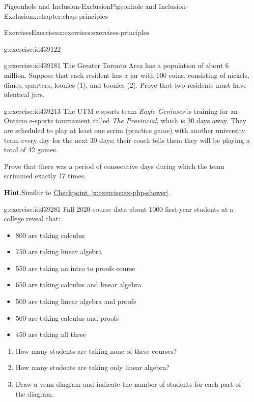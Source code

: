 \documentclass[oneside,10pt,]{book}
\newcommand{\blocktitlefont}{\relax}
\newcommand{\xreffont}{\relax}
\numberwithin{equation}{section}
\begin{document}
\begin{chapterptx}{Pigeonhole and Inclusion-Exclusion}{}{Pigeonhole and Inclusion-Exclusion}{}{}{x:chapter:chap-principles}
\begin{exercises-section}{Exercises}{}{Exercises}{}{}{x:exercises:exercises-principles}
\begin{divisionexercise}{8}{}{}{g:exercise:id439122}
\end{divisionexercise}%
\begin{divisionexercise}{9}{}{}{g:exercise:id439181}%
The Greater Toronto Area has a population of about 6 million. Suppose that each resident has a jar with 100 coins, consisting of nickels, dimes, quarters, loonies (\textdollar{}1), and toonies (\textdollar{}2). Prove that two residents must have identical jars.%
\end{divisionexercise}%
\begin{divisionexercise}{10}{}{}{g:exercise:id439213}%
The UTM e-sports team \emph{Eagle Geniuses} is training for an Ontario e-sports tournament called \emph{The Provincial}, which is 30 days away. They are scheduled to play at least one scrim (practice game) with another university team every day for the next 30 days; their coach tells them they will be playing a total of 42 games.%
\par
Prove that there was a period of consecutive days during which the team scrimmed exactly 17 times.%
\par\smallskip%
\noindent\textbf{\blocktitlefont Hint}.\hypertarget{g:hint:id439300}{}\quad{}Similar to \hyperref[x:exercise:ex-php-shower]{Checkpoint~{\xreffont\ref{x:exercise:ex-php-shower}}}.%
\end{divisionexercise}%
\begin{divisionexercise}{11}{}{}{g:exercise:id439281}%
Fall 2020 course data about 1000 first-year students at a college reveal that:%
\begin{itemize}[label=\textbullet]
\item{}800 are taking calculus%
\item{}750 are taking linear algebra%
\item{}550 are taking an intro to proofs course%
\item{}650 are taking calculus and linear algebra%
\item{}500 are taking linear algebra and proofs%
\item{}500 are taking calculus and proofs%
\item{}450 are taking all three%
\end{itemize}
%
\begin{enumerate}[label=(\alph*)]
\item{}How many students are taking none of these courses?%
\item{}How many students are taking only linear algebra?%
\item{}Draw a venn diagram and indicate the number of students for each part of the diagram.%

\end{enumerate}
\end{divisionexercise}
\end{exercises-section}
\end{chapterptx}
\end{document}
